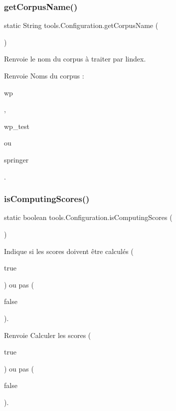 \subsubsection{\texorpdfstring{get\+Corpus\+Name()}{getCorpusName()}}
{\footnotesize\ttfamily static String tools.\+Configuration.\+get\+Corpus\+Name (\begin{DoxyParamCaption}{ }\end{DoxyParamCaption})\hspace{0.3cm}{\ttfamily [static]}}

Renvoie le nom du corpus à traiter par l\textquotesingle{}index.

\begin{DoxyReturn}{Renvoie}
Noms du corpus \+:
\begin{DoxyCode}
wp 
\end{DoxyCode}
 ,
\begin{DoxyCode}
wp\_test 
\end{DoxyCode}
 ou
\begin{DoxyCode}
springer 
\end{DoxyCode}
 . 
\end{DoxyReturn}
\mbox{\label{classtools_1_1Configuration_a4fc9e233e37fe826479bb43cce4a2f7a}} 
\subsubsection{\texorpdfstring{is\+Computing\+Scores()}{isComputingScores()}}
{\footnotesize\ttfamily static boolean tools.\+Configuration.\+is\+Computing\+Scores (\begin{DoxyParamCaption}{ }\end{DoxyParamCaption})\hspace{0.3cm}{\ttfamily [static]}}

Indique si les scores doivent être calculés (
\begin{DoxyCode}
\textcolor{keyword}{true} 
\end{DoxyCode}
 ) ou pas (
\begin{DoxyCode}
\textcolor{keyword}{false} 
\end{DoxyCode}
 ).

\begin{DoxyReturn}{Renvoie}
Calculer les scores (
\begin{DoxyCode}
\textcolor{keyword}{true} 
\end{DoxyCode}
 ) ou pas (
\begin{DoxyCode}
\textcolor{keyword}{false} 
\end{DoxyCode}
 ). 
\end{DoxyReturn}
\mbox{\label{classtools_1_1Configuration_ab64c49265c65926e4fdd088a4e5c5059}} 
